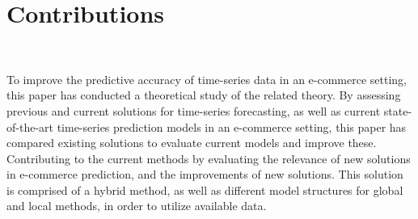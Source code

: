 
\section{Contributions}~\label{cont}
\label{section:Discussion:Contributions}

To improve the predictive accuracy of time-series data in an e-commerce setting,
this paper has conducted a theoretical study of the related theory.
By assessing previous and current solutions for time-series forecasting, as well as current state-of-the-art time-series prediction models in an e-commerce setting,
this paper has compared existing solutions to evaluate current models and improve these.
Contributing to the current methods by evaluating the relevance of new solutions in e-commerce prediction,
and the improvements of new solutions.
This solution is comprised of a hybrid method, as well as different model structures for global and local methods,
in order to utilize available data.



